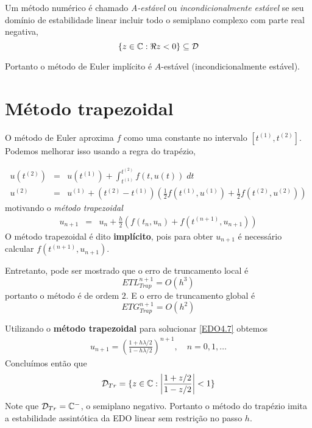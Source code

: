 \begin{defn}
Um método numérico é chamado \emph{A-estável} ou \emph{incondicionalmente estável} se seu domínio de estabilidade linear incluir todo o semiplano complexo com parte real negativa,
$$    \{z \in \mathbb{C}: \Re{z}<0\} \subseteq \mathcal D$$
\end{defn}


Portanto o método de Euler implícito é $A$-estável (incondicionalmente estável).





\section{Método trapezoidal}
O método de Euler aproxima $f$ como uma constante no intervalo $[t^{(1)},t^{(2)}]$. Podemos melhorar isso usando a regra do trapézio,

\begin{eqnarray}
  u(t^{(2)}) &=& u(t^{(1)}) +  \int _{t^{(1)}}^{t^{(2)}}  f(t,u(t)) \; dt \\
  u^{(2)}    &=&   u^{(1)}  +  (t^{(2)}-t^{(1)})\left(\frac{1}{2}f(t^{(1)},u^{(1)})+\frac{1}{2}f(t^{(2)},u^{(2)})\right)
\end{eqnarray}
motivando o \emph{método trapezoidal}
\begin{eqnarray}
  u_{n+1} &=& u_n +  \frac{h}{2} \left(f(t_n,u_n)+f(t^{(n+1)},u_{n+1})\right)
\end{eqnarray}
O método trapezoidal é dito \textbf{implícito}, pois para obter $u_{n+1}$ é necessário calcular $f(t^{(n+1)},u_{n+1})$.

Entretanto, pode ser mostrado que o erro de truncamento local é
$$ETL_{Trap}^{n+1}= O(h^3)$$
portanto o método é de ordem $2$. E o erro de truncamento global é
$$ETG_{Trap}^{n+1}= O(h^2)$$


\begin{ex}
Utilizando o \textbf{método trapezoidal} para solucionar \eqref{EDO4.7} obtemos
\begin{eqnarray}
 u_{n+1} = \left(\frac{1+ h\lambda /2}{1- h\lambda /2}\right)^{n+1}, \quad  n=0,1,\ldots
\end{eqnarray}
Concluímos então que
\begin{eqnarray}
 \mathcal D_{Tr} = \{z \in  \mathbb{C}:  \left|\frac{1+ z/2}{1- z/2}\right|<1\}
\end{eqnarray}
Note que $\mathcal D_{Tr}=\mathbb{C}^-$, o semiplano negativo. Portanto o método do trapézio imita a estabilidade assintótica da EDO linear sem restrição no passo $h$.
\end{ex}



